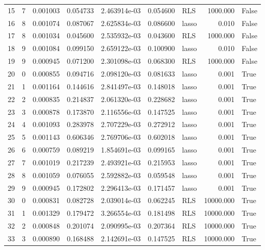 \documentclass[12pt]{article}
\begin{document}
\begin{longtable}{lrrrrrlrl}
		15 &       7 &   0.001003 &  0.054733 &  2.463914e-03 &  0.054600 &    RLS &   1000.000 &  False \\
		16 &       8 &   0.001074 &  0.087067 &  2.625834e-03 &  0.086600 &  lasso &      0.010 &  False \\
		17 &       8 &   0.001034 &  0.045600 &  2.535932e-03 &  0.043600 &    RLS &   1000.000 &  False \\
		18 &       9 &   0.001084 &  0.099150 &  2.659122e-03 &  0.100900 &  lasso &      0.010 &  False \\
		19 &       9 &   0.000945 &  0.071200 &  2.301098e-03 &  0.068300 &    RLS &   1000.000 &  False \\
		20 &       0 &   0.000855 &  0.094716 &  2.098120e-03 &  0.081633 &  lasso &      0.001 &   True \\
		21 &       1 &   0.001164 &  0.144616 &  2.841497e-03 &  0.148018 &  lasso &      0.001 &   True \\
		22 &       2 &   0.000835 &  0.214837 &  2.061320e-03 &  0.228682 &  lasso &      0.001 &   True \\
		23 &       3 &   0.000878 &  0.173870 &  2.116556e-03 &  0.147525 &  lasso &      0.001 &   True \\
		24 &       4 &   0.001093 &  0.283978 &  2.707229e-03 &  0.272912 &  lasso &      0.001 &   True \\
		25 &       5 &   0.001143 &  0.606346 &  2.769706e-03 &  0.602018 &  lasso &      0.001 &   True \\
		26 &       6 &   0.000759 &  0.089219 &  1.854691e-03 &  0.099165 &  lasso &      0.001 &   True \\
		27 &       7 &   0.001019 &  0.217239 &  2.493921e-03 &  0.215953 &  lasso &      0.001 &   True \\
		28 &       8 &   0.001059 &  0.076055 &  2.592882e-03 &  0.059548 &  lasso &      0.001 &   True \\
		29 &       9 &   0.000945 &  0.172802 &  2.296413e-03 &  0.171457 &  lasso &      0.001 &   True \\
		30 &       0 &   0.000831 &  0.082728 &  2.039014e-03 &  0.062245 &    RLS &  10000.000 &   True \\
		31 &       1 &   0.001329 &  0.179472 &  3.266554e-03 &  0.181498 &    RLS &  10000.000 &   True \\
		32 &       2 &   0.000848 &  0.201074 &  2.090995e-03 &  0.207364 &    RLS &  10000.000 &   True \\
		33 &       3 &   0.000890 &  0.168488 &  2.142691e-03 &  0.147525 &    RLS &  10000.000 &   True \\

\end{longtable}
\end{document}

